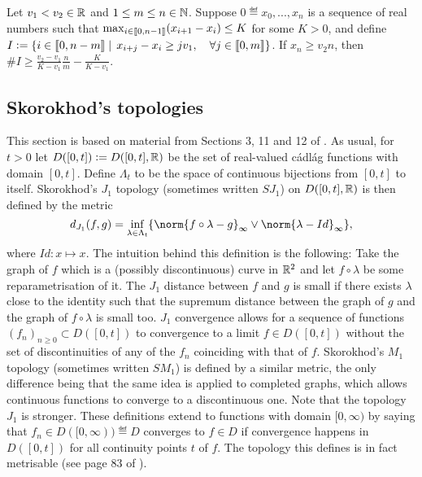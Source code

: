 \begin{lemma}\label{lem:ExpTailsGoodSequencesTechnical}
Let $v_1 < v_2 \in \mathbb{R}$ and $1 \leq m \leq n \in \mathbb{N}$. Suppose $0 \eqdef x_0, ..., x_n$ is a sequence of real numbers such that $\max_{i \in \llbracket0, n - 1\rrbracket} (x_{i+1} - x_i) \leq K$ for some $K > 0$, and define $I \vcentcolon= \{ i \in \llbracket0, n - m\rrbracket \mid\, x_{i + j} - x_i \geq j v_1,\quad \forall j\in\llbracket0,m\rrbracket\}$. If $x_n \geq v_2 n$, then $\#I \geq \frac{v_2 - v_1}{K - v_1}\frac{n}{m} - \frac{K}{K - v_1}$. 
\end{lemma}






\subsection{Skorokhod's topologies}
This section is based on material from Sections 3, 11 and 12 of \cite{jacod2013limit}. As usual, for $t > 0$ let $D([0, t]) \vcentcolon= D([0, t], \mathbb{R})$ be the set of real-valued cádlág functions with domain $[0, t]$. Define $\Lambda_t$ to be the space of continuous bijections from $[0,t]$ to itself. Skorokhod's $J_1$ topology (sometimes written $SJ_1$) on $D([0,t], \mathbb{R})$ is then defined by the metric 
\begin{equation}
d_{J_1}(f,g) = \inf_{\lambda \in \Lambda_t} \{ \norm{f \circ \lambda - g}_{\infty} \lor \norm{\lambda - Id}_{\infty} \}, 
\end{equation}
where $Id : x \mapsto x$. The intuition behind this definition is the following: Take the graph of $f$ which is a (possibly discontinuous) curve in $\mathbb{R}^2$ and let $f \circ \lambda$ be some reparametrisation of it. The $J_1$ distance between $f$ and $g$ is small if there exists $\lambda$ close to the identity such that the supremum distance between the graph of $g$ and the graph of $f \circ \lambda$ is small too. $J_1$ convergence allows for a sequence of functions $(f_n)_{n \geq 0} \subset D([0, t])$ to convergence to a limit $f\in D([0, t])$ without the set of discontinuities of any of the $f_n$ coinciding with that of $f$. Skorokhod's $M_1$ topology (sometimes written $SM_1$) is defined by a similar metric, the only difference being that the same idea is applied to completed graphs, which allows continuous functions to converge to a discontinuous one. Note that the topology $J_1$ is stronger. These definitions extend to functions with domain $[0, \infty)$ by saying that $f_n \in D([0, \infty)) \eqdef D$ converges to $f \in D$ if convergence happens in $D([0, t])$ for all continuity points $t$ of $f$. The topology this defines is in fact metrisable (see page 83 of \cite{jacod2013limit}). \\

